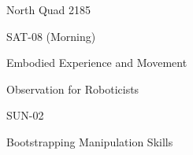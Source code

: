 \documentclass{article}
\begin{document}
\rssheader[1in]

\fontsize{32pt}{36pt}
\selectfont
\begin{center}
North Quad 2185
\end{center}

\vfill

\fontsize{48pt}{56pt}
\selectfont
\begin{center}
SAT-08 (Morning)
\end{center}

\fontsize{24pt}{28pt}
\selectfont
\begin{center}
Embodied Experience and Movement \par \noindent Observation for Roboticists
\end{center}

\vfill

\fontsize{48pt}{56pt}
\selectfont
\begin{center}
SUN-02
\end{center}

\fontsize{24pt}{24pt}
\selectfont
\begin{center}
Bootstrapping Manipulation Skills
\end{center}

\vfill
\end{document}
